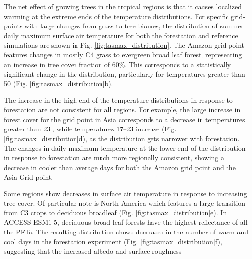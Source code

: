 \documentclass[]{article}
\begin{document}
The net effect of growing trees in the tropical regions is that it causes localized warming at the extreme ends of the temperature distributions.
For specific grid-points with large changes from grass to tree biomes, the distribution of summer daily maximum surface air temperature for both the forestation and reference simulations are shown in Fig. \ref{fig:tasmax_distribution}.
The Amazon grid-point features changes in mostly C4 grass to evergreen broad leaf forest, representing an increase in tree cover fraction of 60\%.
This corresponds to a statistically significant change in the distribution, particularly for temperatures greater than 50 \textcelsius{} (Fig. \ref{fig:tasmax_distribution}b).

The increase in the high end of the temperature distributions in response to forestation are not consistent for all regions.
For example, the large increase in forest cover for the grid point in Asia corresponds to a decrease in temperatures greater than 23 \textcelsius{}, while temperatures 17--23 \textcelsius{} increase (Fig. \ref{fig:tasmax_distribution}d), as the distribution gets narrower with forestation.
The changes in daily maximum temperature at the lower end of the distribution in response to forestation are much more regionally consistent, showing a decrease in cooler than average days for both the Amazon grid point and the Asia Grid point.

Some regions show decreases in surface air temperature in response to increasing tree cover.
Of particular note is North America which features a large transition from C3 crops to deciduous broadleaf (Fig. \ref{fig:tasmax_distribution}e).
In ACCESS-ESM1-5, deciduous broad leaf forests have the highest reflectance of all the PFTs.
The resulting distribution shows decreases in the number of warm and cool days in the forestation experiment (Fig. \ref{fig:tasmax_distribution}f), suggesting that the increased albedo and surface roughness 
\end{document}
